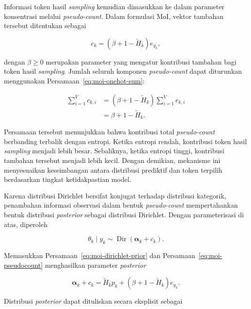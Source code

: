 Informasi token hasil \textit{sampling} kemudian dimasukkan ke dalam parameter konsentrasi melalui \textit{pseudo-count}. Dalam formulasi MoI, vektor tambahan tersebut ditentukan sebagai

\begin{equation}
c_k
=
\left(\beta+1-\widetilde H_k\right)e_{y_k},
\label{eq:moi-pseudocount}
\end{equation}

dengan $\beta\geq0$ merupakan parameter yang mengatur kontribusi tambahan bagi token hasil \textit{sampling}. Jumlah seluruh komponen \textit{pseudo-count} dapat diturunkan menggunakan Persamaan~\eqref{eq:moi-onehot-sum}:

\begin{align}
\sum_{i=1}^{V}c_{k,i}
&=
\left(\beta+1-\widetilde H_k\right)
\sum_{i=1}^{V}e_{k,i} \\
&=
\beta+1-\widetilde H_k.
\label{eq:moi-total-pseudocount}
\end{align}

Persamaan tersebut menunjukkan bahwa kontribusi total \textit{pseudo-count} berbanding terbalik dengan entropi. Ketika entropi rendah, kontribusi token hasil \textit{sampling} menjadi lebih besar. Sebaliknya, ketika entropi tinggi, kontribusi tambahan tersebut menjadi lebih kecil. Dengan demikian, mekanisme ini menyesuaikan keseimbangan antara distribusi prediktif dan token terpilih berdasarkan tingkat ketidakpastian model.

Karena distribusi Dirichlet bersifat konjugat terhadap distribusi kategorik, penambahan informasi observasi dalam bentuk \textit{pseudo-count} mempertahankan bentuk distribusi \textit{posterior} sebagai distribusi Dirichlet. Dengan parameterisasi di atas, diperoleh

\begin{equation}
\theta_k\mid y_k
\sim
\operatorname{Dir}(\boldsymbol{\alpha}_k+c_k).
\label{eq:moi-posterior}
\end{equation}

Memasukkan Persamaan~\eqref{eq:moi-dirichlet-prior} dan Persamaan~\eqref{eq:moi-pseudocount} menghasilkan parameter \textit{posterior}

\begin{equation}
\boldsymbol{\alpha}_k+c_k
=
\widetilde H_kp_k
+
\left(\beta+1-\widetilde H_k\right)e_{y_k}.
\label{eq:moi-posterior-parameter}
\end{equation}

Distribusi \textit{posterior} dapat dituliskan secara eksplisit sebagai

